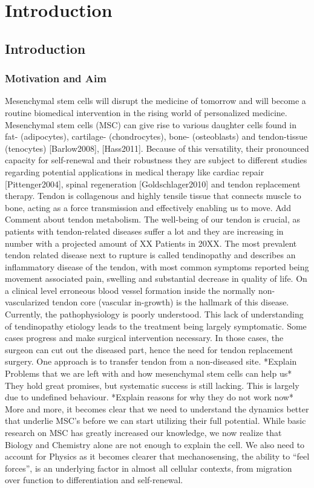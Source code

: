 \newcommand{\package}{\emph}


\chapter{Introduction}

\section{Introduction}
\subsection{Motivation and Aim}
\label{sec:motivation}
Mesenchymal stem cells will disrupt the medicine of tomorrow and will become a routine biomedical intervention in the rising world of personalized medicine. 
Mesenchymal stem cells (MSC) can give rise to various daughter cells found in fat- (adipocytes), cartilage- (chondrocytes), bone- (osteoblasts) and tendon-tissue (tenocytes) [Barlow2008], [Hass2011]. Because of this versatility, their pronounced capacity for self-renewal and their robustness they are subject to different studies regarding potential applications in medical therapy like cardiac repair [Pittenger2004], spinal regeneration [Goldschlager2010] and tendon replacement therapy.  
Tendon is collagenous and highly tensile tissue that connects muscle to bone, acting as a force transmission and effectively enabling us to move. Add Comment about tendon metabolism. The well-being of our tendon is crucial, as patients with tendon-related diseases suffer a lot and they are increasing in number with a projected amount of XX Patients in 20XX. The most prevalent tendon related disease next to rupture is called tendinopathy and describes an inflammatory disease of the tendon, with most common symptoms reported being movement associated pain, swelling and substantial decrease in quality of life. On a clinical level erroneous blood vessel formation inside the normally non-vascularized tendon core (vascular in-growth) is the hallmark of this disease. Currently, the pathophysiology is poorly understood. This lack of understanding of tendinopathy etiology leads to the treatment being largely symptomatic.  Some cases progress and make surgical intervention necessary. In those cases, the surgeon can cut out the diseased part, hence the need for tendon replacement surgery.  One approach is to transfer tendon from a non-diseased site. *Explain Problems that we are left with and how mesenchymal stem cells can help us* They hold great promises, but systematic success is still lacking. This is largely due to undefined behaviour. *Explain reasons for why they do not work now* More and more, it becomes clear that we need to understand the dynamics better that underlie MSC’s before we can start utilizing their full potential. While basic research on MSC has greatly increased our knowledge, we now realize that Biology and Chemistry alone are not enough to explain the cell. We also need to account for Physics as it becomes clearer that mechanosensing, the ability to “feel forces”, is an underlying factor in almost all cellular contexts, from migration over function to differentiation and self-renewal.  
